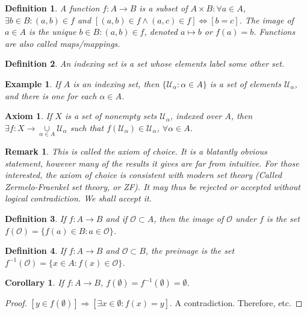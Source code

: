 \documentclass[oneside]{book}
\theoremstyle{mystyle}
\newtheorem{definition}{Definition}[section]
\newtheorem{corollary}{Corollary}[section]
\newtheorem{example}{Example}[section]
\newtheorem{remark}{Remark}[section]
\newtheorem{axiom}{Axiom}[section]
\begin{document}
\begin{definition}
A function $f:A\rightarrow B$ is a subset of $A\times B: \forall a\in A$, $\exists b\in B: (a,b)\in f$ and $[(a,b)\in f\land (a,c)\in f]\Leftrightarrow [b=c]$. The image of $a\in A$ is the unique $b\in B:(a,b)\in f$, denoted $a\mapsto b$ or $f(a)=b$. Functions are also called maps/mappings.
\end{definition}

\begin{definition}
An indexing set is a set whose elements label some other set.
\end{definition}

\begin{example}
If $A$ is an indexing set, then $\{\mathcal{U}_{\alpha}:\alpha \in A\}$ is a set of elements $\mathcal{U}_{\alpha}$, and there is one for each $\alpha \in A$.
\end{example}

\begin{axiom}
If $X$ is a set of nonempty sets $\mathcal{U}_{\alpha}$, indexed over $A$, then $\exists f:X\rightarrow \underset{\alpha \in A}\cup \mathcal{U}_{\alpha}$ such that $f(\mathcal{U}_{\alpha}) \in \mathcal{U}_{\alpha}$, $\forall \alpha\in A$.
\end{axiom}

\begin{remark}
This is called the axiom of choice. It is a blatantly obvious statement, however many of the results it gives are far from intuitive. For those interested, the axiom of choice is consistent with modern set theory (Called Zermelo-Fraenkel set theory, or ZF). It may thus be rejected or accepted without logical contradiction. We shall accept it.
\end{remark}

\begin{definition}
If $f:A\rightarrow B$ and if $\mathcal{O}\subset A$, then the image of $\mathcal{O}$ under $f$ is the set $f(\mathcal{O}) = \{f(a)\in B:a\in \mathcal{O}\}$.
\end{definition}

\begin{definition}
If $f:A\rightarrow B$ and $\mathscr{O}\subset B$, the preimage is the set $f^{-1}(\mathscr{O}) = \{x\in A:f(x)\in \mathscr{O}\}$.
\end{definition}

\begin{corollary}
If $f:A\rightarrow B$, $f(\emptyset) = f^{-1}(\emptyset) = \emptyset$.
\end{corollary}
\begin{proof}
$[y\in f(\emptyset)]\Rightarrow [\exists x\in \emptyset:f(x)=y]$. A contradiction. Therefore, etc.
\end{proof}
\end{document}
